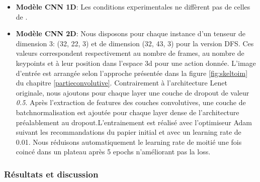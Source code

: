 \begin{itemize}
    \item \textbf{Modèle CNN 1D}: Les conditions experimentales ne diffèrent pas de celles de \cite{2019arXiv190709658Y}.
    \item \textbf{Modèle CNN 2D}: Nous disposons pour chaque instance d'un tenseur de dimension 3: (32, 22, 3) et de dimension (32, 43, 3) pour la version DFS. Ces valeurs correspondent respectivement au nombre de frames, au nombre de keypoints et à leur position dans l'espace 3d pour une action donnée. L'image d'entrée est arrangée selon l'approche présentée dans la figure \ref{fig:skeltoim} du chapitre \ref{partieconvolutive}. \newline Contrairement à l'architecture Lenet \cite{lecun1998gradient} originale, nous ajoutons pour chaque layer une couche de dropout de valeur \textit{0.5}. Après l'extraction de features des couches convolutives, une couche de batchnormalisation est ajoutée pour chaque layer dense de l'architecture préalablement au dropout.\newline L'entrainement est réalisé avec l'optimiseur Adam \cite{kingma2014adam} suivant les recommandations du papier initial et avec un learning rate de 0.01. Nous réduisons automatiquement le learning rate de moitié une fois coincé dans un plateau après 5 epochs n'améliorant pas la loss.
\end{itemize}



\subsubsection{Résultats et discussion}

